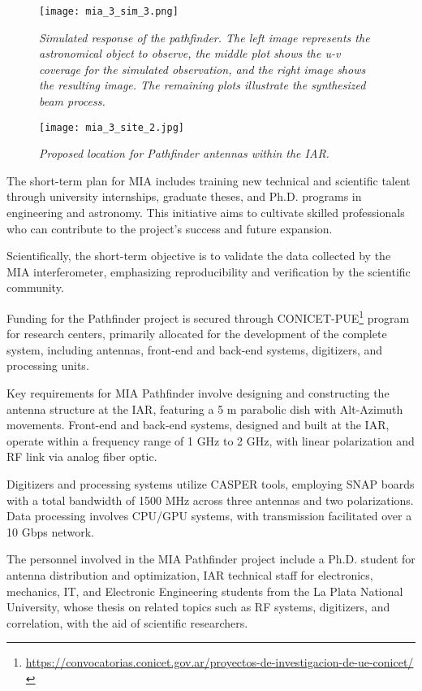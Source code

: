 \documentclass[baaa]{baaa}
\begin{document}
\begin{figure}[!t]
  \centering
  \texttt{[image: mia\_3\_sim\_3.png]}
  \caption{\emph{Simulated response of the pathfinder. The left image represents the astronomical object to observe, the middle plot shows the u-v coverage for the simulated observation, and the right image shows the resulting image. The remaining plots illustrate the synthesized beam process.}}
  \label{fig:mia3sim}
\end{figure}

\begin{figure}[!t]
  \texttt{[image: mia\_3\_site\_2.jpg]}
  \caption{\emph{Proposed location for Pathfinder antennas within the IAR.}}
  \label{fig:mia3site}
\end{figure}


The short-term plan for MIA includes training new technical and scientific talent through university internships, graduate theses, and Ph.D. programs in engineering and astronomy. This initiative aims to cultivate skilled professionals who can contribute to the project's success and future expansion.

Scientifically, the short-term objective is to validate the data collected by the MIA interferometer, emphasizing reproducibility and verification by the scientific community.

Funding for the Pathfinder project is secured through CONICET-PUE\footnote{\url{https://convocatorias.conicet.gov.ar/proyectos-de-investigacion-de-ue-conicet/}} program for research centers, primarily allocated for the development of the complete system, including antennas, front-end and back-end systems, digitizers, and processing units.

Key requirements for MIA Pathfinder involve designing and constructing the antenna structure at the IAR, featuring a 5 m parabolic dish with Alt-Azimuth movements. Front-end and back-end systems, designed and built at the IAR, operate within a frequency range of 1 GHz to 2 GHz, with linear polarization and RF link via analog fiber optic.

Digitizers and processing systems utilize CASPER tools, employing SNAP boards with a total bandwidth of 1500 MHz across three antennas and two polarizations. Data processing involves CPU/GPU systems, with transmission facilitated over a 10 Gbps network.

The personnel involved in the MIA Pathfinder project include a Ph.D. student for antenna distribution and optimization, IAR technical staff for electronics, mechanics, IT, and Electronic Engineering students from the La Plata National University, whose thesis on related topics such as RF systems, digitizers, and correlation, with the aid of scientific researchers.
\end{document}
